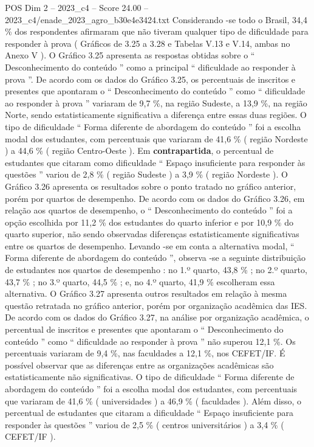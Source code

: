 \begin{textsample}{POS Dim 2 – 2023\_c4 – Score 24.00 – 2023\_c4/enade\_2023\_agro\_b30e4e3424.txt}
Considerando -se todo o Brasil, 34,4 \% dos respondentes afirmaram que não tiveram qualquer tipo de dificuldade para responder à prova ( Gráficos de 3.25 a 3.28 e Tabelas V.13 e V.14, ambas no Anexo V ).
O Gráfico 3.25 apresenta as respostas obtidas sobre o “ Desconhecimento do conteúdo ” como a principal “ dificuldade ao responder à prova ”.
De acordo com os dados do Gráfico 3.25, os percentuais de inscritos e presentes que apontaram o “ Desconhecimento do conteúdo ” como “ dificuldade ao responder à prova ” variaram de 9,7 \%, na região Sudeste, a 13,9 \%, na região Norte, sendo estatisticamente significativa a diferença entre essas duas regiões.
O tipo de dificuldade “ Forma diferente de abordagem do conteúdo ” foi a escolha modal dos estudantes, com percentuais que variaram de 41,6 \% ( região Nordeste ) a 44,6 \% ( região Centro-Oeste ).
Em \textbf{contrapartida}, o percentual de estudantes que citaram como dificuldade “ Espaço insuficiente para responder às questões ” variou de 2,8 \% ( região Sudeste ) a 3,9 \% ( região Nordeste ).
O Gráfico 3.26 apresenta os resultados sobre o ponto tratado no gráfico anterior, porém por quartos de desempenho.
De acordo com os dados do Gráfico 3.26, em relação aos quartos de desempenho, o “ Desconhecimento do conteúdo ” foi a opção escolhida por 11,2 \% dos estudantes do quarto inferior e por 10,9 \% do quarto superior, não sendo observadas diferenças estatisticamente significativas entre os quartos de desempenho.
Levando -se em conta a alternativa modal, “ Forma diferente de abordagem do conteúdo ”, observa -se a seguinte distribuição de estudantes nos quartos de desempenho : no 1.º quarto, 43,8 \% ; no 2.º quarto, 43,7 \% ; no 3.º quarto, 44,5 \% ; e, no 4.º quarto, 41,9 \% escolheram essa alternativa.
O Gráfico 3.27 apresenta outros resultados em relação à mesma questão retratada no gráfico anterior, porém por organização acadêmica das IES.
De acordo com os dados do Gráfico 3.27, na análise por organização acadêmica, o percentual de inscritos e presentes que apontaram o “ Desconhecimento do conteúdo ” como “ dificuldade ao responder à prova ” não superou 12,1 \%.
Os percentuais variaram de 9,4 \%, nas faculdades a 12,1 \%, nos CEFET/IF.
É possível observar que as diferenças entre as organizações acadêmicas são estatisticamente não significativas.
O tipo de dificuldade “ Forma diferente de abordagem do conteúdo ” foi a escolha modal dos estudantes, com percentuais que variaram de 41,6 \% ( universidades ) a 46,9 \% ( faculdades ).
Além disso, o percentual de estudantes que citaram a dificuldade “ Espaço insuficiente para responder às questões ” variou de 2,5 \% ( centros universitários ) a 3,4 \% ( CEFET/IF ).

\end{textsample}
